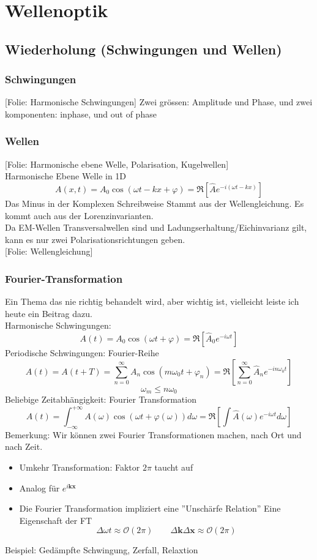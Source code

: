 \documentclass[titlepage,11pt,a4paper,ngerman]{report}
\newcommand{\folie}[1]{\color{gray}[Folie: #1]\color{black}}
\newcommand{\summ}[2]{\sum_{#1}^{#2}}
\newcommand{\intt}[2]{\int_{#1}^{#2}}
\renewcommand{\vec}[1]{\boldsymbol{#1}}
\newcommand{\lcom}[1]{\color{MidnightBlue}#1\color{black}}
\begin{document}
\chapter{Wellenoptik}
\section{Wiederholung (Schwingungen und Wellen)}
\subsection{Schwingungen}
\folie{Harmonische Schwingungen}
\lcom{Zwei grössen: Amplitude und Phase, und zwei komponenten: inphase, und out of phase}
\subsection{Wellen}
\folie{Harmonische ebene Welle, Polarisation, Kugelwellen}\\
Harmonische Ebene Welle in 1D
\begin{equation*}
A(x,t) = A_0 \cos (\omega t - kx + \varphi)= \Re\left[\hat{A} e^{-i(\omega t - kx)}\right]
\end{equation*}
\lcom{Das Minus in der Komplexen Schreibweise Stammt aus der Wellengleichung. Es kommt auch aus der Lorenzinvarianten. }\\
\lcom{Da EM-Wellen Transversalwellen sind und Ladungserhaltung/Eichinvarianz gilt, kann es nur zwei Polarisationsrichtungen geben. }\\
\folie{Wellengleichung}

\subsection{Fourier-Transformation}
\lcom{Ein Thema das nie richtig behandelt wird, aber wichtig ist, vielleicht leiste ich heute ein Beitrag dazu.}\\
Harmonische Schwingungen:
$$A(t) = A_0 \cos (\omega t + \varphi) = \Re [\hat A_0 e^{-i\omega t}]$$
Periodische Schwingungen: Fourier-Reihe
$$A(t) = A(t + T) = \summ{n = 0}{\infty} A_n \cos(m \omega_0 t + \varphi_n) = \Re \left[\summ{n = 0}{\infty} \hat A_n e^{-i n \omega_0 t}\right]$$
$$\omega_m \leq n \omega_0$$
Beliebige Zeitabhängigkeit: Fourier Transformation
$$A(t) = \intt{-\infty}{+\infty} A(\omega) \cos (\omega t + \varphi(\omega)) d \omega = \Re [\int \hat A (\omega) e^{-i\omega t} d \omega]$$
Bemerkung: \lcom{Wir können zwei Fourier Transformationen machen, nach Ort und nach Zeit.}
\begin{itemize}
	\item Umkehr Transformation: Faktor $2 \pi$ taucht auf
	\item Analog für $e^{i \vec{k} \vec{x}}$
	\item Die Fourier Transformation impliziert eine ''Unschärfe Relation'' \lcom{Eine Eigenschaft der FT}
		$$\Delta \omega t \approx \mathcal O(2 \pi) \qquad \Delta \vec{k} \Delta \vec{x} \approx \mathcal O(2\pi)$$
\end{itemize}
Beispiel: Gedämpfte Schwingung, Zerfall, Relaxtion\\
\end{document}

